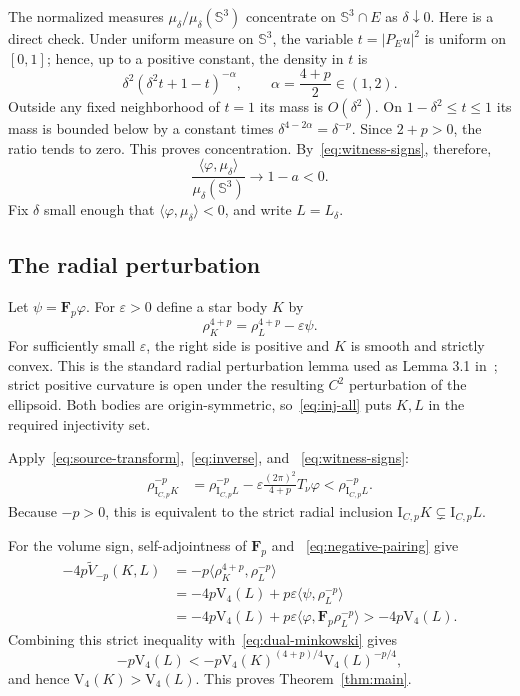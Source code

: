 \documentclass[11pt]{article}
\newcommand{\Sph}{\mathbb S}
\newcommand{\Vol}{\mathrm V}
\newcommand{\F}{\mathbf F}
\newcommand{\I}{\mathrm I}
\newcommand{\pair}[2]{\langle #1,#2\rangle}
\begin{document}
The normalized measures $\mu_\delta/\mu_\delta(\Sph^3)$ concentrate on
$\Sph^3\cap E$ as $\delta\downarrow0$.  Here is a direct check.  Under uniform
measure on $\Sph^3$, the variable $t=|P_Eu|^2$ is uniform on $[0,1]$; hence,
up to a positive constant, the density in $t$ is
\[
 \delta^2(\delta^2t+1-t)^{-\alpha},
 \qquad \alpha=\frac{4+p}{2}\in(1,2).
\]
Outside any fixed neighborhood of $t=1$ its mass is $O(\delta^2)$.  On
$1-\delta^2\le t\le1$ its mass is bounded below by a constant times
$\delta^{4-2\alpha}=\delta^{-p}$.  Since $2+p>0$, the ratio tends to zero.
This proves concentration.  By~\eqref{eq:witness-signs}, therefore,
\begin{equation}\label{eq:negative-pairing}
 \frac{\pair{\varphi}{\mu_\delta}}
      {\mu_\delta(\Sph^3)}\longrightarrow1-a<0.
\end{equation}
Fix $\delta$ small enough that $\pair{\varphi}{\mu_\delta}<0$, and write
$L=L_\delta$.

\subsection{The radial perturbation}

Let $\psi=\F_p\varphi$.  For $\varepsilon>0$ define a star body $K$ by
\begin{equation}\label{eq:K-def}
 \rho_K^{4+p}=\rho_L^{4+p}-\varepsilon\psi.
\end{equation}
For sufficiently small $\varepsilon$, the right side is positive and $K$ is
smooth and strictly convex.  This is the standard radial perturbation lemma
used as Lemma 3.1 in~\cite{EH}; strict positive curvature is open under the
resulting $C^2$ perturbation of the ellipsoid.  Both bodies are
origin-symmetric, so~\eqref{eq:inj-all} puts $K,L$ in the required
injectivity set.

Apply~\eqref{eq:source-transform},~\eqref{eq:inverse}, and
~\eqref{eq:witness-signs}:
\begin{align*}
 \rho_{\I_{C,p}K}^{-p}
 &=\rho_{\I_{C,p}L}^{-p}
 -\varepsilon\frac{(2\pi)^2}{4+p}T_\nu\varphi
 <\rho_{\I_{C,p}L}^{-p}.
\end{align*}
Because $-p>0$, this is equivalent to the strict radial inclusion
$\I_{C,p}K\subsetneq\I_{C,p}L$.

For the volume sign, self-adjointness of $\F_p$ and
~\eqref{eq:negative-pairing} give
\begin{align*}
 -4p\widetilde V_{-p}(K,L)
 &=-p\pair{\rho_K^{4+p}}{\rho_L^{-p}}\\
 &=-4p\Vol_4(L)
   +p\varepsilon\pair{\psi}{\rho_L^{-p}}\\
 &=-4p\Vol_4(L)
   +p\varepsilon\pair{\varphi}{\F_p\rho_L^{-p}}
 >-4p\Vol_4(L).
\end{align*}
Combining this strict inequality with~\eqref{eq:dual-minkowski} gives
\[
 -p\Vol_4(L)
 <-p\Vol_4(K)^{(4+p)/4}\Vol_4(L)^{-p/4},
\]
and hence $\Vol_4(K)>\Vol_4(L)$.  This proves Theorem~\ref{thm:main}.
\end{document}
